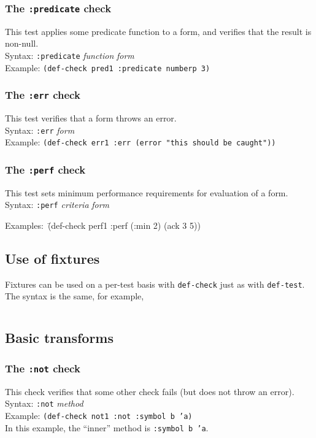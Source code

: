 \documentclass{article}
\begin{document}
\subsubsection{The \texttt{:predicate} check} 
This test applies some predicate function to a form, and verifies that
the result is non-null.
\\ Syntax: \texttt{:predicate} \textit{function} \textit{form}
\\ Example: \texttt{(def-check pred1 :predicate numberp 3)}

\subsubsection{The \texttt{:err} check} 
This test verifies that a form throws an
error.
\\ Syntax: \texttt{:err} \textit{form}
\\ Example: \texttt{(def-check err1 :err (error "this should be caught"))}

\subsubsection{The \texttt{:perf} check} 
This test sets minimum performance requirements for evaluation of a
form.
\\ Syntax: \texttt{:perf} \textit{criteria} \textit{form}
{\ttfamily\begin{tabbing}
\textrm{Examples:}\ \=(def-check perf1 :perf (:min 2) (ack 3 5))
\end{tabbing}}

\subsection{Use of fixtures}

Fixtures can be used on a per-test basis with \texttt{def-check} just
as with \texttt{def-test}.  The syntax is the same, for example,
\begin{verbatim}
\end{verbatim}

\subsection{Basic transforms}

\subsubsection{The \texttt{:not} check} 
This check verifies that some other check fails (but does not throw an
error).
\\ Syntax: \texttt{:not} \textit{method}
\\ Example: \texttt{(def-check not1 :not :symbol b 'a)}
\\In this example, the ``inner'' method is \texttt{:symbol b 'a}\enspace.
\end{document}
